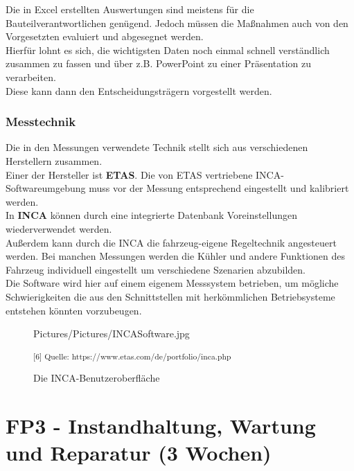 Die in Excel erstellten Auswertungen sind meistens für die Bauteilverantwortlichen genügend. Jedoch müssen die Maßnahmen auch von den Vorgesetzten evaluiert und abgesegnet werden.\\

Hierfür lohnt es sich, die wichtigsten Daten noch einmal schnell verständlich zusammen zu fassen und über z.B. PowerPoint zu einer Präsentation zu verarbeiten.\\
Diese kann dann den Entscheidungsträgern vorgestellt werden. 

\subsubsection{Messtechnik}

Die in den Messungen verwendete Technik stellt sich aus verschiedenen Herstellern zusammen. \\
Einer der Hersteller ist \textbf{ETAS}. Die von ETAS vertriebene INCA-Softwareumgebung muss vor der Messung entsprechend eingestellt und kalibriert werden.\\
In \textbf{INCA} können durch eine integrierte Datenbank Voreinstellungen wiederverwendet werden. \\
Außerdem kann durch die INCA die fahrzeug-eigene Regeltechnik angesteuert werden. Bei manchen Messungen werden die Kühler und andere Funktionen des Fahrzeug individuell eingestellt um verschiedene Szenarien abzubilden. \\
Die Software wird hier auf einem eigenem Messsystem betrieben, um mögliche Schwierigkeiten die aus den Schnittstellen mit herkömmlichen Betriebsysteme entstehen könnten vorzubeugen.

\begin{figure}
	\begin{center}
		\begin{overpic}[width=\linewidth]{Pictures/Pictures/INCASoftware.jpg}
			
		\end{overpic}
	
	\caption{Die INCA-Benutzeroberfläche}
	\small\textsuperscript{[6] Quelle: https://www.etas.com/de/portfolio/inca.php}
	\label{INCA}
	\end{center}
\end{figure}


\newpage
\section{FP3 - Instandhaltung, Wartung und Reparatur (3 Wochen)}

